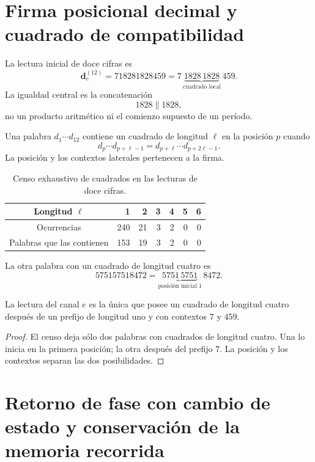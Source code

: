 \section{Firma posicional decimal y cuadrado de compatibilidad}

La lectura inicial de doce cifras es
\[
 \mathbf d_e^{(12)}
 =718281828459
 =7\,\underbrace{1828\,1828}_{\text{cuadrado local}}\,459.
\]
La igualdad central es la concatenación
\[
 1828\mathbin{\|}1828,
\]
no un producto aritmético ni el comienzo supuesto de un período.

\begin{definition}
Una palabra \(d_1\cdots d_{12}\) contiene un cuadrado de longitud \(\ell\)
en la posición \(p\) cuando
\[
 d_p\cdots d_{p+\ell-1}
 =d_{p+\ell}\cdots d_{p+2\ell-1}.
\]
La posición y los contextos laterales pertenecen a la firma.
\end{definition}

\begin{table}[htbp]
\centering
\caption{Censo exhaustivo de cuadrados en las lecturas de doce cifras.}
\label{gfp:b:tab:censo-cuadrados-e}
\begin{tabular}{c*{6}{r}}
\toprule
Longitud \(\ell\)&1&2&3&4&5&6\\
\midrule
Ocurrencias&240&21&3&2&0&0\\
Palabras que las contienen&153&19&3&2&0&0\\
\bottomrule
\end{tabular}
\end{table}

La otra palabra con un cuadrado de longitud cuatro es
\[
 575157518472
 =\underbrace{5751\,5751}_{\text{posición inicial }1}\,8472.
\]

\begin{proposition}
\label{gfp:b:prop:cuadrado-posicional-e}
La lectura del canal \(e\) es la única que posee un cuadrado de longitud
cuatro después de un prefijo de longitud uno y con contextos \(7\) y \(459\).
\end{proposition}

\begin{proof}
El censo deja sólo dos palabras con cuadrados de longitud cuatro. Una lo
inicia en la primera posición; la otra después del prefijo \(7\). La
posición y los contextos separan las dos posibilidades.
\end{proof}

\section{Retorno de fase con cambio de estado y conservación de la memoria recorrida}

